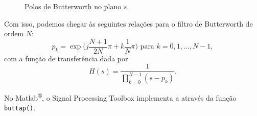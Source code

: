 \begin{figure}[hbtp]
\caption{Polos de Butterworth no plano $s$.}
\label{fig:splane}
\end{figure}

Com isso, podemos chegar às seguintes relações para o filtro de Butterworth de ordem $N$:
\begin{equation}\label{eq:buttpoles}
	\boxed{p_k=\exp\bigg(j\frac{N+1}{2N}\pi+k\frac{1}{N}\pi\bigg)\text{ para }k=0,1,\ldots,N-1,}
\end{equation}
com a função de transferência dada por
\begin{equation}\label{eq:tfbutt}
	\boxed{H(s)=\frac{1}{\displaystyle\prod_{k=0}^{N-1}(s-p_k)}.}
\end{equation}

No Matlab\textsuperscript{®}, o Signal Processing Toolbox implementa a  através da função \lstinline{buttap()}.
